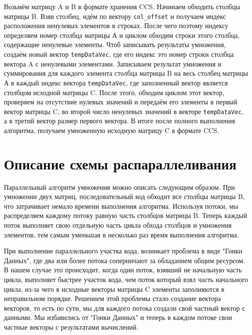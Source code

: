 \documentclass[14pt,a4paper,report]{ncc}
\begin{document}
	
	Возьмём матрицу A и B в формате хранения CCS. Начинаем обходить столбцы матрицы B. Взяв столбец, идём по вектору \verb|col_offset| и получаем индекс расположения ненулевых элементов в строках. После чего поэтому индексу определяем номер столбца матрицы А и циклом обходим строки этого столбца, содержащие ненулевые элементы. Чтоб записывать результаты умножения, создаём новый вектор \verb|tempDataVec|, где его индекс это номер строки столбца вектора A с ненулевыми элементами. Записываем результат умножения и суммирования для каждого элемента столбца матрицы B на весь столбец матрицы А в каждый индекс вектора \verb|tempDataVec|, где заполненный вектор является столбцом исходной матрицы C. После этого, обходим циклом этот вектор, проверяем на отсутствие нулевых значений и передаём его элементы в первый вектор матрицы C, во второй число ненулевых значений в векторе \verb|tempDataVec|, а в третий вектор размер первого вектора. В итоге после полного выполнения алгоритма, получаем умноженную исходную матрицу C в формате CCS.
	\newpage
	
	\section*{Описание схемы распараллеливания}
	Параллельный алгоритм умножения можно описать следующим образом. При умножении двух матриц, последовательный код обходит все столбцы матрицы B, что затрачивает немало времени выполнения алгоритма. Используя потоки, мы распределяем каждому потоку равную часть столбцов матрицы B. Теперь каждый поток выполняет свою отдельную часть цикла обхода столбцов и умножения элементов, тем самым уменьшая в несколько раз время выполнения алгоритма. 
	\par При выполнение параллельного участка кода, возникает проблема в виде "Гонки Данных", где два или более потока соперничают за обладанием общим ресурсом. В нашем случае это происходит, когда один поток, взявший не начальную часть цикла, выполняет быстрее участок кода, чем поток который взял часть начального цикла, из-за чего в исходные векторы матрицы C элементы заполняются в неправильном порядке. Решением этой проблемы стало создание вектора векторов, то есть по сути, мы для каждого потока создали свой частный вектор с данными. Мы избавились от "Гонки Данных" и теперь в каждом потоке свои частные векторы с результатами вычислений.
	
	
	
	
	
	
	

	
	
	
	
\end{document}
